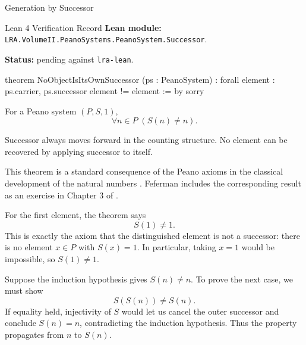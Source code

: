 \begin{topicbox}{Generation by Successor}
\begin{formalizationrecord}{Lean 4 Verification Record}
\textbf{Lean module:} \texttt{LRA.VolumeII.PeanoSystems.PeanoSystem.Successor}.\par
{}
\textbf{Status:} pending against \texttt{lra-lean}.\par

\begin{leancode}
theorem NoObjectIsItsOwnSuccessor
    (ps : PeanoSystem) :
    forall element : ps.carrier,
      ps.successor element != element := by
  sorry
\end{leancode}
\end{formalizationrecord}

\begin{remark*}
For a Peano system $(P,S,1)$,
\[
\forall n \in P\;(S(n) \neq n).
\]
\end{remark*}

\begin{remark*}[Interpretation]
Successor always moves forward in the counting structure. No element can be
recovered by applying successor to itself.
\end{remark*}

\begin{remark*}
This theorem is a standard consequence of the Peano axioms in the classical
development of the natural numbers \citep{PeanoArithmeticesPrincipia1889}.
Feferman includes the corresponding result as an exercise in Chapter 3 of
\citet{FefermanNumberSystems1964}.
\end{remark*}

\begin{workedexample}
For the first element, the theorem says
\[
S(1)\neq 1.
\]
This is exactly the axiom that the distinguished element is not a successor:
there is no element $x\in P$ with $S(x)=1$. In particular, taking $x=1$
would be impossible, so $S(1)\neq 1$.
\end{workedexample}

\begin{workedexample}
Suppose the induction hypothesis gives $S(n)\neq n$. To prove the next case,
we must show
\[
S(S(n))\neq S(n).
\]
If equality held, injectivity of $S$ would let us cancel the outer successor
and conclude $S(n)=n$, contradicting the induction hypothesis. Thus the
property propagates from $n$ to $S(n)$.
\end{workedexample}


\end{topicbox}

